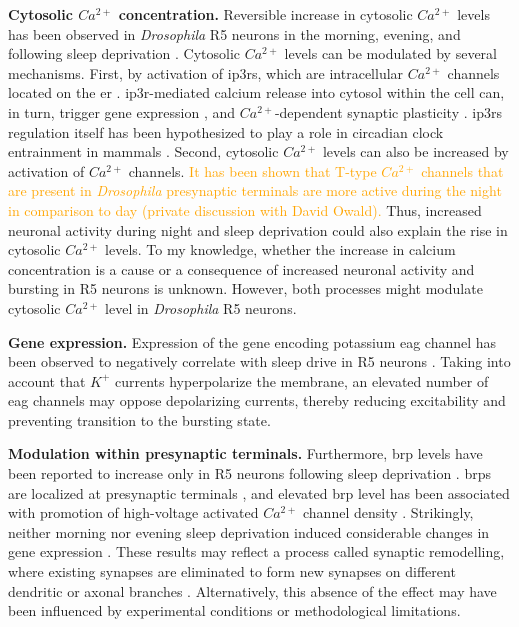 \documentclass[../main.tex]{subfiles}
\begin{document}
\textbf{Cytosolic $Ca^{2+}$ concentration.}
Reversible increase in cytosolic $Ca^{2+}$ levels has been observed in \textit{Drosophila} R5 neurons in the morning, evening, and following sleep deprivation \parencite{andreaniCircadianProgrammingEllipsoid2022,liuSleepDriveEncoded2016}. Cytosolic $Ca^{2+}$ levels can be modulated by several mechanisms. First, by activation of \glspl{ip3r}, which are intracellular $Ca^{2+}$ channels located on the \gls{er} \parencite{schmitzStructuralBasisActivation2022}. \gls{ip3r}-mediated calcium release into cytosol within the cell can, in turn, trigger gene expression \parencite{schmitzStructuralBasisActivation2022}, and $Ca^{2+}$-dependent synaptic plasticity \parencite{liuSleepDriveEncoded2016}. \glspl{ip3r} regulation itself has been hypothesized to play a role in circadian clock entrainment in mammals \parencite{hamadaRoleInositolTrisphosphateinduced1999}. Second, cytosolic $Ca^{2+}$ levels can also be increased by activation of $Ca^{2+}$ channels. \textcolor{orange}{It has been shown that T-type $Ca^{2+}$ channels that are present in \textit{Drosophila} presynaptic terminals are more active during the night in comparison to day (private discussion with David Owald).}
Thus, increased neuronal activity during night and sleep deprivation could also explain the rise in cytosolic $Ca^{2+}$ levels. To my knowledge, whether the increase in calcium concentration is a cause or a consequence of increased neuronal activity and bursting in R5 neurons is unknown. However, both processes might modulate cytosolic $Ca^{2+}$ level in \textit{Drosophila} R5 neurons.

\textbf{Gene expression.}
Expression of the gene encoding potassium \gls{eag} channel has been observed to negatively correlate with sleep drive in R5 neurons \parencite{doppSinglecellTranscriptomicsReveals2024}. Taking into account that $K^{+}$ currents hyperpolarize the membrane, an elevated number of \gls{eag} channels may oppose depolarizing currents, thereby reducing excitability and preventing transition to the bursting state.

\textbf{Modulation within presynaptic terminals.}
Furthermore, \gls{brp} levels have been reported to increase only in R5 neurons following sleep deprivation \parencite{liuSleepDriveEncoded2016}. \glspl{brp} are localized at presynaptic terminals \parencite{waghBruchpilotProteinHomology2006}, and elevated \gls{brp} level has been associated with promotion of high-voltage activated $Ca^{2+}$ channel density \parencite{kittelBruchpilotPromotesActive2006}. Strikingly, neither morning nor evening sleep deprivation induced considerable changes in gene expression \parencite{andreaniCircadianProgrammingEllipsoid2022}. These results may reflect a process called synaptic remodelling, where existing synapses are eliminated to form new synapses on different dendritic or axonal branches \parencite{kurupNeuralCircuitRewiring2016}. Alternatively, this absence of the effect may have been influenced by experimental conditions or methodological limitations.
\end{document}
